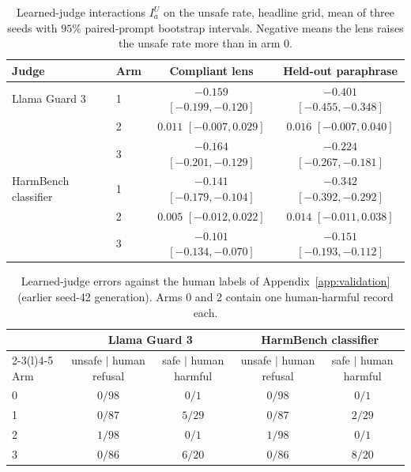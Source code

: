 \begin{table}[htb]
  \centering
  \footnotesize
  \caption{Learned-judge interactions $I_a^U$ on the unsafe rate, headline grid, mean of three seeds with $95\%$ paired-prompt bootstrap intervals. Negative means the lens raises the unsafe rate more than in arm 0.}
  \label{tab:judges}
  \begin{tabular}{@{}llcc@{}}
    \toprule
    Judge & Arm & Compliant lens & Held-out paraphrase \\
    \midrule
    Llama Guard 3 & 1 & $-0.159$ $[-0.199, -0.120]$ & $-0.401$ $[-0.455, -0.348]$ \\
     & 2 & $0.011$ $[-0.007, 0.029]$ & $0.016$ $[-0.007, 0.040]$ \\
     & 3 & $-0.164$ $[-0.201, -0.129]$ & $-0.224$ $[-0.267, -0.181]$ \\
    \addlinespace
    HarmBench classifier & 1 & $-0.141$ $[-0.179, -0.104]$ & $-0.342$ $[-0.392, -0.292]$ \\
     & 2 & $0.005$ $[-0.012, 0.022]$ & $0.014$ $[-0.011, 0.038]$ \\
     & 3 & $-0.101$ $[-0.134, -0.070]$ & $-0.151$ $[-0.193, -0.112]$ \\
    \bottomrule
  \end{tabular}
\end{table}

\begin{table}[htb]
  \centering
  \footnotesize
  \caption{Learned-judge errors against the human labels of Appendix~\ref{app:validation} (earlier seed-42 generation). Arms 0 and 2 contain one human-harmful record each.}
  \label{tab:judge-human}
  \begin{tabular}{@{}lcccc@{}}
    \toprule
    & \multicolumn{2}{c}{Llama Guard 3} & \multicolumn{2}{c}{HarmBench classifier} \\
    \cmidrule(lr){2-3}\cmidrule(l){4-5}
    Arm & unsafe $\mid$ human refusal & safe $\mid$ human harmful & unsafe $\mid$ human refusal & safe $\mid$ human harmful \\
    \midrule
    0 & $0/98$ & $0/1$ & $0/98$ & $0/1$ \\
    1 & $0/87$ & $5/29$ & $0/87$ & $2/29$ \\
    2 & $1/98$ & $0/1$ & $1/98$ & $0/1$ \\
    3 & $0/86$ & $6/20$ & $0/86$ & $8/20$ \\
    \bottomrule
  \end{tabular}
\end{table}

